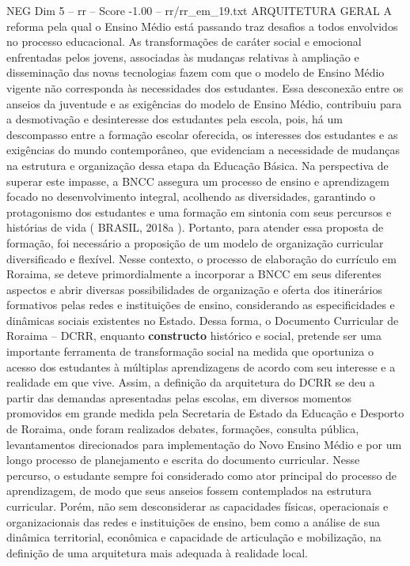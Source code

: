 \begin{textsample}{NEG Dim 5 – rr – Score -1.00 – rr/rr\_em\_19.txt}  \label{ex:f5_neg_061}
ARQUITETURA GERAL A reforma pela qual o Ensino Médio está passando traz desafios a todos envolvidos no processo educacional.
As transformações de caráter social e emocional enfrentadas pelos jovens, associadas às mudanças relativas à ampliação e disseminação das novas tecnologias fazem com que o modelo de Ensino Médio vigente não corresponda às necessidades dos estudantes.
Essa desconexão entre os anseios da juventude e as exigências do modelo de Ensino Médio, contribuiu para a desmotivação e desinteresse dos estudantes pela escola, pois, há um descompasso entre a formação escolar oferecida, os interesses dos estudantes e as exigências do mundo contemporâneo, que evidenciam a necessidade de mudanças na estrutura e organização dessa etapa da Educação Básica.
Na perspectiva de superar este impasse, a BNCC assegura um processo de ensino e aprendizagem focado no desenvolvimento integral, acolhendo as diversidades, garantindo o protagonismo dos estudantes e uma formação em sintonia com seus percursos e histórias de vida ( BRASIL, 2018a ).
Portanto, para atender essa proposta de formação, foi necessário a proposição de um modelo de organização curricular diversificado e flexível.
Nesse contexto, o processo de elaboração do currículo em Roraima, se deteve primordialmente a incorporar a BNCC em seus diferentes aspectos e abrir diversas possibilidades de organização e oferta dos itinerários formativos pelas redes e instituições de ensino, considerando as especificidades e dinâmicas sociais existentes no Estado.
Dessa forma, o Documento Curricular de Roraima – DCRR, enquanto \textbf{constructo} histórico e social, pretende ser uma importante ferramenta de transformação social na medida que oportuniza o acesso dos estudantes à múltiplas aprendizagens de acordo com seu interesse e a realidade em que vive.
Assim, a definição da arquitetura do DCRR se deu a partir das demandas apresentadas pelas escolas, em diversos momentos promovidos em grande medida pela Secretaria de Estado da Educação e Desporto de Roraima, onde foram realizados debates, formações, consulta pública, levantamentos direcionados para implementação do Novo Ensino Médio e por um longo processo de planejamento e escrita do documento curricular.
Nesse percurso, o estudante sempre foi considerado como ator principal do processo de aprendizagem, de modo que seus anseios fossem contemplados na estrutura curricular.
Porém, não sem desconsiderar as capacidades físicas, operacionais e organizacionais das redes e instituições de ensino, bem como a análise de sua dinâmica territorial, econômica e capacidade de articulação e mobilização, na definição de uma arquitetura mais adequada à realidade local.

\end{textsample}
